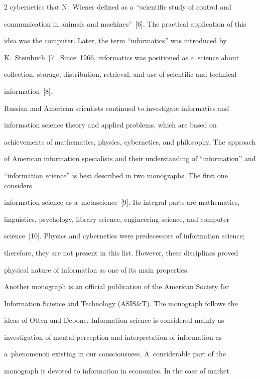 \begin{multicols}{2}
cybernetics that N.~Wiener defined as a~``scientific study of control and 

communication in animals and machines''~[6]. The practical application of this 

idea was the computer. Later, the term ``informatics'' was introduced by 

K.~Steinbuch~[7]. Since~1966, informatics was positioned as a~science about 

collection, storage, distribution, retrieval, and use of scientific and technical 

information~[8].

    

    Russian and American scientists continued to investigate informatics and 

information science theory and applied problems, which are based on 

achievements of mathematics, physics, cybernetics, and philosophy. The approach 

of American information specialists and their understanding of ``information'' and 

``information science'' is best described in two monographs. The first one considers 

information science as a~metascience~[9]. Its integral parts are mathematics, 

linguistics, psychology, library science, engineering science, and computer 

science~[10]. Physics and cybernetics were predecessors of information science; 

therefore, they are not present in this list. However, these disciplines proved 

physical nature of information as one of its main properties.

    

    Another monograph is an official publication of the American Society for 

Information Science and Technology (ASIS\&T). The monograph follows the 

ideas of Otten and Debone. Information science is considered mainly as 

investigation of mental perception and interpretation of information as 

a~phenomenon existing in our consciousness. A~considerable part of the 

monograph is devoted to information in economics. In the case of market 


\end{multicols}
